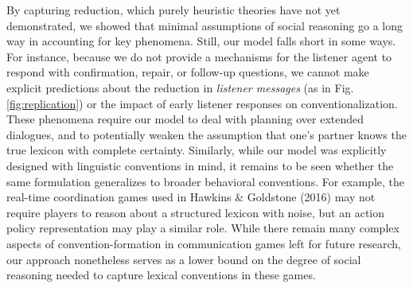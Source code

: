 By capturing reduction, which purely heuristic theories have not yet
demonstrated, we showed that minimal assumptions of social reasoning go
a long way in accounting for key phenomena. Still, our model falls short
in some ways. For instance, because we do not provide a mechanisms for
the listener agent to respond with confirmation, repair, or follow-up
questions, we cannot make explicit predictions about the reduction in
\emph{listener messages} (as in Fig. \ref{fig:replication}) or the
impact of early listener responses on conventionalization. These
phenomena require our model to deal with planning over extended
dialogues, and to potentially weaken the assumption that one's partner
knows the true lexicon with complete certainty. Similarly, while our
model was explicitly designed with linguistic conventions in mind, it
remains to be seen whether the same formulation generalizes to broader
behavioral conventions. For example, the real-time coordination games
used in Hawkins \& Goldstone (2016) may not require players to reason
about a structured lexicon with noise, but an action policy
representation may play a similar role. While there remain many complex
aspects of convention-formation in communication games left for future
research, our approach nonetheless serves as a lower bound on the degree
of social reasoning needed to capture lexical conventions in these
games.
